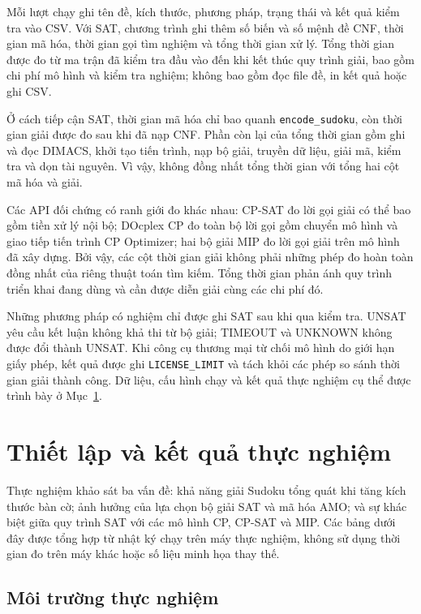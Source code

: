 \documentclass[a4paper,fleqn]{cas-sc}
\begin{document}
Mỗi lượt chạy ghi tên đề, kích thước, phương pháp, trạng thái và kết
quả kiểm tra vào CSV. Với SAT, chương trình ghi thêm số biến và số
mệnh đề CNF, thời gian mã hóa, thời gian gọi tìm nghiệm và tổng thời
gian xử lý. Tổng thời gian được đo từ ma trận đã kiểm tra đầu vào đến
khi kết thúc quy trình giải, bao gồm chi phí mô hình và kiểm tra nghiệm;
không bao gồm đọc file đề, in kết quả hoặc ghi CSV.

Ở cách tiếp cận SAT, thời gian mã hóa chỉ bao quanh
\texttt{encode\_sudoku}, còn thời gian giải được đo sau khi đã nạp CNF.
Phần còn lại của tổng thời gian gồm ghi và đọc DIMACS, khởi tạo tiến
trình, nạp bộ giải, truyền dữ liệu, giải mã, kiểm tra và dọn tài nguyên.
Vì vậy, không đồng nhất tổng thời gian với tổng hai cột mã hóa và giải.

Các API đối chứng có ranh giới đo khác nhau: CP-SAT đo lời gọi giải có
thể bao gồm tiền xử lý nội bộ; DOcplex CP đo toàn bộ lời gọi gồm chuyển
mô hình và giao tiếp tiến trình CP Optimizer; hai bộ giải MIP đo lời
gọi giải trên mô hình đã xây dựng. Bởi vậy, các cột thời gian giải
không phải những phép đo hoàn toàn đồng nhất của riêng thuật toán tìm
kiếm. Tổng thời gian phản ánh quy trình triển khai đang dùng và cần
được diễn giải cùng các chi phí đó.

Những phương pháp có nghiệm chỉ được ghi SAT sau khi qua kiểm tra.
UNSAT yêu cầu kết luận không khả thi từ bộ giải; TIMEOUT và UNKNOWN
không được đổi thành UNSAT. Khi công cụ thương mại từ chối mô hình do
giới hạn giấy phép, kết quả được ghi \texttt{LICENSE\_LIMIT} và tách
khỏi các phép so sánh thời gian giải thành công. Dữ liệu, cấu hình chạy
và kết quả thực nghiệm cụ thể được trình bày ở Mục~\ref{sec:thucnghiem}.


\section{Thiết lập và kết quả thực nghiệm}
\label{sec:thucnghiem}

Thực nghiệm khảo sát ba vấn đề: khả năng giải Sudoku tổng quát khi tăng
kích thước bàn cờ; ảnh hưởng của lựa chọn bộ giải SAT và mã hóa AMO;
và sự khác biệt giữa quy trình SAT với các mô hình CP, CP-SAT và MIP.
Các bảng dưới đây được tổng hợp từ nhật ký chạy trên máy thực nghiệm,
không sử dụng thời gian đo trên máy khác hoặc số liệu minh họa thay thế.

\subsection{Môi trường thực nghiệm}
\end{document}

